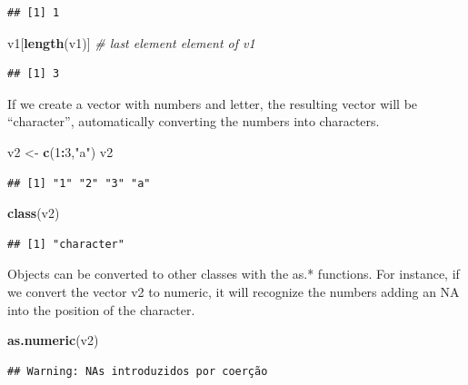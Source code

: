 \documentclass[12pt,graybox,envcountchap,sectrefs]{krantz}
\makeatletter
\newenvironment{Shaded}{\begin{snugshade}}{\end{snugshade}}
\newcommand{\KeywordTok}[1]{\textcolor[rgb]{0.13,0.29,0.53}{\textbf{#1}}}
\newcommand{\DecValTok}[1]{\textcolor[rgb]{0.00,0.00,0.81}{#1}}
\newcommand{\StringTok}[1]{\textcolor[rgb]{0.31,0.60,0.02}{#1}}
\newcommand{\CommentTok}[1]{\textcolor[rgb]{0.56,0.35,0.01}{\textit{#1}}}
\newcommand{\OperatorTok}[1]{\textcolor[rgb]{0.81,0.36,0.00}{\textbf{#1}}}
\newcommand{\NormalTok}[1]{#1}
\newenvironment{kframe}{%
\medskip{}
\setlength{\fboxsep}{.8em}
 \def\at@end@of@kframe{}%
 \ifinner\ifhmode%
  \def\at@end@of@kframe{\end{minipage}}%
  \begin{minipage}{\columnwidth}%
 \fi\fi%
 \def\FrameCommand##1{\hskip\@totalleftmargin \hskip-\fboxsep
 \colorbox{shadecolor}{##1}\hskip-\fboxsep
     \hskip-\linewidth \hskip-\@totalleftmargin \hskip\columnwidth}%
 \MakeFramed {\advance\hsize-\width
   \@totalleftmargin\z@ \linewidth\hsize
   \@setminipage}}%
 {\par\unskip\endMakeFramed%
 \at@end@of@kframe}
\renewenvironment{Shaded}{\begin{kframe}}{\end{kframe}}
\theoremstyle{definition}
\theoremstyle{definition}
\theoremstyle{definition}
\theoremstyle{remark}
\makeatother
\begin{document}
\begin{verbatim}
## [1] 1
\end{verbatim}

\begin{Shaded}
\begin{Highlighting}[]
\NormalTok{v1[}\KeywordTok{length}\NormalTok{(v1)] }\CommentTok{# last element element of v1}
\end{Highlighting}
\end{Shaded}

\begin{verbatim}
## [1] 3
\end{verbatim}

If we create a vector with numbers and letter, the resulting vector will
be ``character'', automatically converting the numbers into characters.

\begin{Shaded}
\begin{Highlighting}[]
\NormalTok{v2 <-}\StringTok{ }\KeywordTok{c}\NormalTok{(}\DecValTok{1}\OperatorTok{:}\DecValTok{3}\NormalTok{,}\StringTok{"a"}\NormalTok{)}
\NormalTok{v2}
\end{Highlighting}
\end{Shaded}

\begin{verbatim}
## [1] "1" "2" "3" "a"
\end{verbatim}

\begin{Shaded}
\begin{Highlighting}[]
\KeywordTok{class}\NormalTok{(v2)}
\end{Highlighting}
\end{Shaded}

\begin{verbatim}
## [1] "character"
\end{verbatim}

Objects can be converted to other classes with the as.* functions. For
instance, if we convert the vector v2 to numeric, it will recognize the
numbers adding an NA into the position of the character.

\begin{Shaded}
\begin{Highlighting}[]
\KeywordTok{as.numeric}\NormalTok{(v2)}
\end{Highlighting}
\end{Shaded}

\begin{verbatim}
## Warning: NAs introduzidos por coerção
\end{verbatim}
\end{document}
